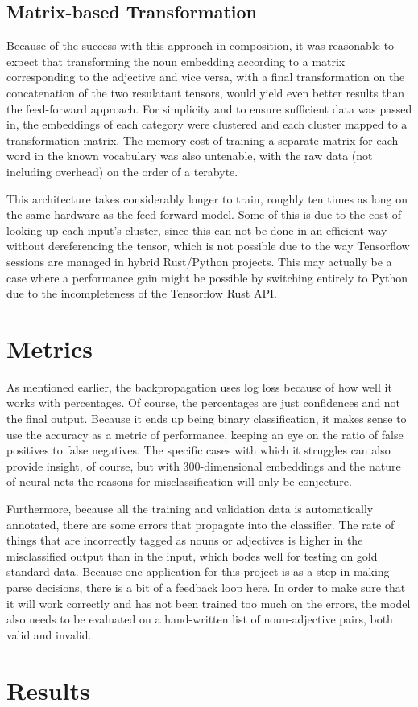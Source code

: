 \documentclass{article}
\begin{document}
\subsection{Matrix-based Transformation}
Because of the success with this approach in composition, it was reasonable to expect that transforming the noun embedding according to a matrix corresponding to the adjective and vice versa, with a final transformation on the concatenation of the two resulatant tensors, would yield even better results than the feed-forward approach. For simplicity and to ensure sufficient data was passed in, the embeddings of each category were clustered and each cluster mapped to a transformation matrix. The memory cost of training a separate matrix for each word in the known vocabulary was also untenable, with the raw data (not including overhead) on the order of a terabyte.

This architecture takes considerably longer to train, roughly ten times as long on the same hardware as the feed-forward model. Some of this is due to the cost of looking up each input's cluster, since this can not be done in an efficient way without dereferencing the tensor, which is not possible due to the way Tensorflow sessions are managed in hybrid Rust/Python projects. This may actually be a case where a performance gain might be possible by switching entirely to Python due to the incompleteness of the Tensorflow Rust API.


\section{Metrics}

As mentioned earlier, the backpropagation uses log loss because of how well it works with percentages. Of course, the percentages are just confidences and not the final output. Because it ends up being binary classification, it makes sense to use the accuracy as a metric of performance, keeping an eye on the ratio of false positives to false negatives. The specific cases with which it struggles can also provide insight, of course, but with 300-dimensional embeddings and the nature of neural nets the reasons for misclassification will only be conjecture.

Furthermore, because all the training and validation data is automatically annotated, there are some errors that propagate into the classifier. The rate of things that are incorrectly tagged as nouns or adjectives is higher in the misclassified output than in the input, which bodes well for testing on gold standard data. Because one application for this project is as a step in making parse decisions, there is a bit of a feedback loop here. In order to make sure that it will work correctly and has not been trained too much on the errors, the model also needs to be evaluated on a hand-written list of noun-adjective pairs, both valid and invalid.


\section{Results}
\end{document}
